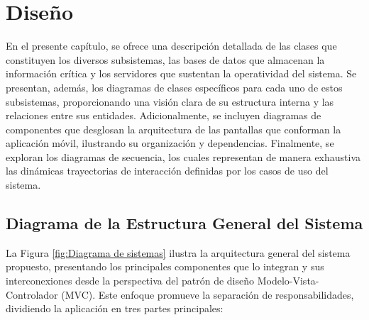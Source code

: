 \chapter{Diseño}

En el presente capítulo, se ofrece una descripción detallada de las clases que constituyen los diversos subsistemas, las bases de datos que almacenan la información crítica y los servidores que sustentan la operatividad del sistema. Se presentan, además, los diagramas de clases específicos para cada uno de estos subsistemas, proporcionando una visión clara de su estructura interna y las relaciones entre sus entidades. Adicionalmente, se incluyen diagramas de componentes que desglosan la arquitectura de las pantallas que conforman la aplicación móvil, ilustrando su organización y dependencias. Finalmente, se exploran los diagramas de secuencia, los cuales representan de manera exhaustiva las dinámicas trayectorias de interacción definidas por los casos de uso del sistema.

\section{Diagrama de la Estructura General del Sistema} 
La Figura \ref{fig:Diagrama de sistemas} ilustra la arquitectura general del sistema propuesto, presentando los principales componentes que lo integran y sus interconexiones desde la perspectiva del patrón de diseño Modelo-Vista-Controlador (MVC). Este enfoque promueve la separación de responsabilidades, dividiendo la aplicación en tres partes principales:

